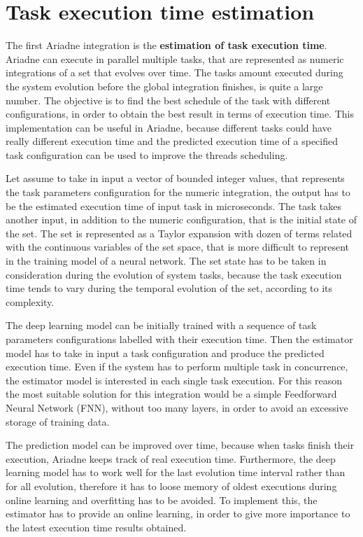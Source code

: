\section{Task execution time estimation}

The first Ariadne integration is the \textbf{estimation of task execution time}. Ariadne can execute in parallel multiple tasks, that are represented as numeric integrations of a set that evolves over time. The tasks amount executed during the system evolution before the global integration finishes, is quite a large number. The objective is to find the best schedule of the task with different configurations, in order to obtain the best result in terms of execution time. This implementation can be useful in Ariadne, because different tasks could have really different execution time and the predicted execution time of a specified task configuration can be used to improve the threads scheduling. 

Let assume to take in input a vector of bounded integer values, that represents the task parameters configuration for the numeric integration, the output has to be the estimated execution time of input task in microseconds. The task takes another input, in addition to the numeric configuration, that is the initial state of the set. The set is represented as a Taylor expansion with dozen of terms related with the continuous variables of the set space, that is more difficult to represent in the training model of a neural network. The set state has to be taken in consideration during the evolution of system tasks, because the task execution time tends to vary during the temporal evolution of the set, according to its complexity. 

The deep learning model can be initially trained with a sequence of task parameters configurations labelled with their execution time. Then the estimator model has to take in input a task configuration and produce the predicted execution time. Even if the system has to perform multiple task in concurrence, the estimator model is interested in each single task execution. For this reason the most suitable solution for this integration would be a simple Feedforward Neural Network (FNN), without too many layers, in order to avoid an excessive storage of training data.

The prediction model can be improved over time, because when tasks finish their execution, Ariadne keeps track of real execution time. Furthermore, the deep learning model has to work well for the last evolution time interval rather than for all evolution, therefore it has to loose memory of oldest executions during online learning and overfitting has to be avoided. To implement this, the estimator has to provide an online learning, in order to give more importance to the latest execution time results obtained.


